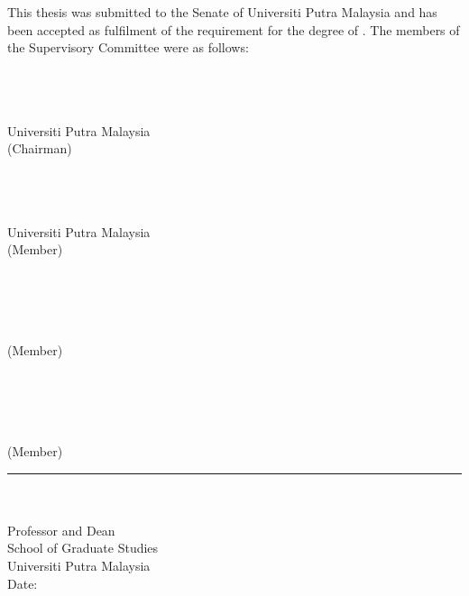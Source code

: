 \newpage

This thesis was submitted to the Senate of Universiti Putra Malaysia and has
been accepted as fulfilment of the requirement for the degree of \infodegreename. The members of the Supervisory Committee were as follows:

\textbf{\infosupervisorname \infosupervisordegree} \\
\infosupervisortitle \\
\infosupervisorfaculty \\
Universiti Putra Malaysia \\
(Chairman)

\textbf{\infocommitteeonename \infocommitteeonedegree} \\
\infocommitteeonetitle \\
\infocommitteeonefaculty \\
Universiti Putra Malaysia \\
(Member)

\textbf{\infocommitteetwoname \infocommitteetwodegree} \\
\infocommitteetwotitle \\
\infocommitteetwofaculty \\
\infocommitteetwouniversity \\
(Member)

\textbf{\infocommitteethreename \infocommitteethreedegree} \\
\infocommitteethreetitle \\
\infocommitteethreefaculty \\
\infocommitteethreeuniversity \\
(Member)

\begin{minipage}[t]{0.5\textwidth}
    \hfill
\end{minipage}
\begin{minipage}[t]{0.5\textwidth}
    \rule{6cm}{0.4pt} \\
    \textbf{\infodeanname \infodeandegree} \\
    Professor and Dean \\
    School of Graduate Studies \\
    Universiti Putra Malaysia \\

    Date: \infosenatedate
\end{minipage}